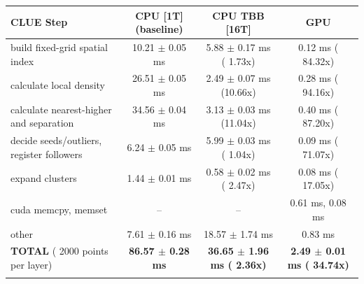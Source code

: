     \begin{tabular}{l|c|c|c}
    \hline
    CLUE Step                                 & CPU [1T] (baseline)         & CPU TBB [16T]                         & GPU                       \\ \hline
    build fixed-grid spatial index            &  10.21 $\pm$  0.05 ms       &   5.88 $\pm$  0.17 ms ( 1.73x)        &   0.12 ms ( 84.32x)       \\
    calculate local density                   &  26.51 $\pm$  0.05 ms       &   2.49 $\pm$  0.07 ms (10.66x)        &   0.28 ms ( 94.16x)       \\
    calculate nearest-higher and separation   &  34.56 $\pm$  0.04 ms       &   3.13 $\pm$  0.03 ms (11.04x)        &   0.40 ms ( 87.20x)       \\
    decide seeds/outliers, register followers &   6.24 $\pm$  0.05 ms       &   5.99 $\pm$  0.03 ms ( 1.04x)        &   0.09 ms ( 71.07x)       \\
    expand clusters                           &   1.44 $\pm$  0.01 ms       &   0.58 $\pm$  0.02 ms ( 2.47x)        &   0.08 ms ( 17.05x)       \\ \hline
    cuda memcpy, memset                       & --                          & --                                    &   0.61 ms,   0.08 ms      \\
    other                                     &   7.61 $\pm$  0.16 ms       &  18.57 $\pm$  1.74 ms                 &   0.83 ms                 \\ \hline
    \textbf{TOTAL} ( 2000 points per layer)   & \textbf{ 86.57 $\pm$  0.28 ms} & \textbf{ 36.65 $\pm$  1.96 ms ( 2.36x)} & \textbf{  2.49 $\pm$  0.01 ms ( 34.74x)}  \\
    \hline
    \multicolumn{4}{c}{}
    \end{tabular}
    \linebreak


